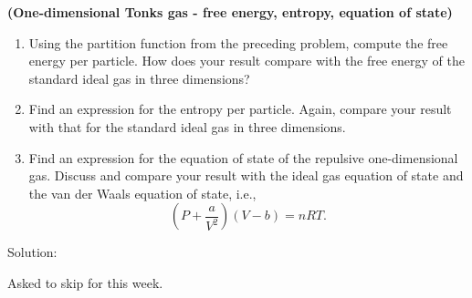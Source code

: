 \newpage
\begin{homeworkProblem}
    \textbf{(One-dimensional Tonks gas - free energy, entropy, equation of state)}

    \begin{enumerate}
        \item[(a)] Using the partition function from the preceding problem, compute the free energy per particle. How does your result compare with the free energy of the standard ideal gas in three dimensions?

        \item[(b)] Find an expression for the entropy per particle. Again, compare your result with that for the standard ideal gas in three dimensions.

        \item[(c)] Find an expression for the equation of state of the repulsive one-dimensional gas. Discuss and compare your result with the ideal gas equation of state and the van der Waals equation of state, i.e.,
            \[
                \left(P+\frac{a}{V^2}\right)(V-b)=nRT.
            \]
    \end{enumerate}
    \begin{callout}{Solution:}

    Asked to skip for this week.

    \end{callout}
\end{homeworkProblem}
